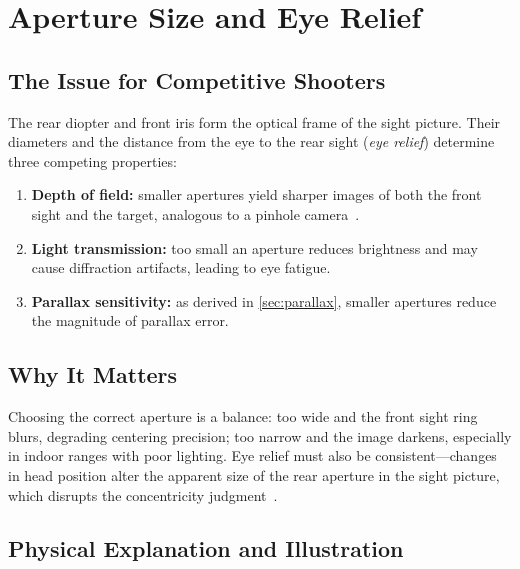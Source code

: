 \documentclass[11pt]{article}
\begin{document}
\section{Aperture Size and Eye Relief}\label{sec:aperture}

\subsection{The Issue for Competitive Shooters}
The rear diopter and front iris form the optical frame of the sight
picture.  Their diameters and the distance from the eye to the rear
sight (\emph{eye relief}) determine three competing properties:
\begin{enumerate}[nosep]
  \item \textbf{Depth of field:} smaller apertures yield sharper images of
        both the front sight and the target, analogous to a pinhole
        camera~\cite{hecht}.
  \item \textbf{Light transmission:} too small an aperture reduces
        brightness and may cause diffraction artifacts, leading to eye
        fatigue.
  \item \textbf{Parallax sensitivity:} as derived in
        \cref{sec:parallax}, smaller apertures reduce the magnitude
        of parallax error.
\end{enumerate}

\subsection{Why It Matters}
Choosing the correct aperture is a balance: too wide and the front
sight ring blurs, degrading centering precision; too narrow and the
image darkens, especially in indoor ranges with poor lighting.  Eye
relief must also be consistent---changes in head position alter the
apparent size of the rear aperture in the sight picture, which
disrupts the concentricity judgment~\cite{nra}.

\subsection{Physical Explanation and Illustration}
\end{document}
